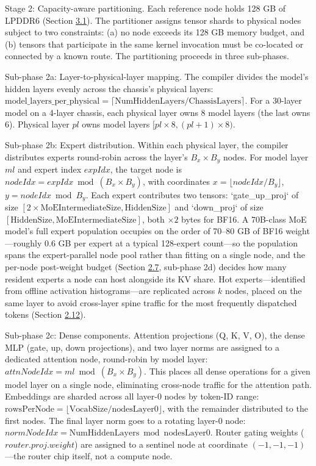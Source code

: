 \documentclass[12pt,onecolumn]{article}
\begin{document}
Stage 2: Capacity-aware partitioning. Each reference node holds 128 GB of LPDDR6 (Section \hyperref[sec:3.1]{3.1}). The partitioner assigns tensor shards to physical nodes subject to two constraints: (a) no node exceeds its 128 GB memory budget, and (b) tensors that participate in the same kernel invocation must be co-located or connected by a known route. The partitioning proceeds in three sub-phases.

Sub-phase 2a: Layer-to-physical-layer mapping. The compiler divides the model's hidden layers evenly across the chassis's physical layers: $\mathrm{model\_layers\_per\_physical} = \lceil \mathrm{NumHiddenLayers} / \mathrm{ChassisLayers} \rceil$. For a 30-layer model on a 4-layer chassis, each physical layer owns 8 model layers (the last owns 6). Physical layer $pl$ owns model layers $[pl \times 8, (pl+1) \times 8)$.

Sub-phase 2b: Expert distribution. Within each physical layer, the compiler distributes experts round-robin across the layer's $B_x \times B_y$ nodes. For model layer $ml$ and expert index $expIdx$, the target node is $nodeIdx = expIdx \bmod (B_x \times B_y)$, with coordinates $x = \lfloor nodeIdx / B_y \rfloor$, $y = nodeIdx \bmod B_y$. Each expert contributes two tensors: `gate\_up\_proj` of size $[2 \times \mathrm{MoEIntermediateSize}, \mathrm{HiddenSize}]$ and `down\_proj` of size $[\mathrm{HiddenSize}, \mathrm{MoEIntermediateSize}]$, both $\times 2$ bytes for BF16. A 70B-class MoE model's full expert population occupies on the order of 70--80 GB of BF16 weight---roughly 0.6 GB per expert at a typical 128-expert count---so the population spans the expert-parallel node pool rather than fitting on a single node, and the per-node post-weight budget (Section \hyperref[sec:2.7]{2.7}, sub-phase 2d) decides how many resident experts a node can host alongside its KV share. Hot experts---identified from offline activation histograms---are replicated across $k$ nodes, placed on the same layer to avoid cross-layer spine traffic for the most frequently dispatched tokens (Section \hyperref[sec:2.12]{2.12}).

Sub-phase 2c: Dense components. Attention projections (Q, K, V, O), the dense MLP (gate, up, down projections), and two layer norms are assigned to a dedicated attention node, round-robin by model layer: $attnNodeIdx = ml \bmod (B_x \times B_y)$. This places all dense operations for a given model layer on a single node, eliminating cross-node traffic for the attention path. Embeddings are sharded across all layer-0 nodes by token-ID range: $\mathrm{rowsPerNode} = \lfloor \mathrm{VocabSize} / \mathrm{nodesLayer0} \rfloor$, with the remainder distributed to the first nodes. The final layer norm goes to a rotating layer-0 node: $normNodeIdx = \mathrm{NumHiddenLayers} \bmod \mathrm{nodesLayer0}$. Router gating weights ($router.proj.weight$) are assigned to a sentinel node at coordinate $(-1, -1, -1)$---the router chip itself, not a compute node.
\end{document}
